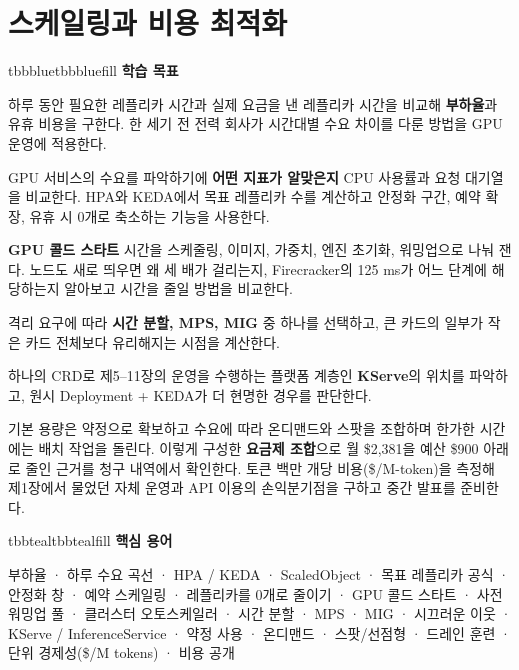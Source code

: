 \setcounter{chapter}{11}
\chapter{스케일링과 비용 최적화}

\begin{calloutbox}{tbbblue}{tbbbluefill}
{\normalsize\bfseries\color{tbbblue}학습 목표}\par\vspace{3pt}
\begin{tbbitemize}
  \item 하루 동안 필요한 레플리카 시간과 실제 요금을 낸 레플리카 시간을 비교해 \textbf{부하율}과 유휴 비용을 구한다. 한 세기 전 전력 회사가 시간대별 수요 차이를 다룬 방법을 GPU 운영에 적용한다.
  \item GPU 서비스의 수요를 파악하기에 \textbf{어떤 지표가 알맞은지} CPU 사용률과 요청 대기열을 비교한다. HPA와 KEDA에서 목표 레플리카 수를 계산하고 안정화 구간, 예약 확장, 유휴 시 0개로 축소하는 기능을 사용한다.
  \item \textbf{GPU 콜드 스타트} 시간을 스케줄링, 이미지, 가중치, 엔진 초기화, 워밍업으로 나눠 잰다. 노드도 새로 띄우면 왜 세 배가 걸리는지, Firecracker의 125 ms가 어느 단계에 해당하는지 알아보고 시간을 줄일 방법을 비교한다.
  \item 격리 요구에 따라 \textbf{시간 분할, MPS, MIG} 중 하나를 선택하고, 큰 카드의 일부가 작은 카드 전체보다 유리해지는 시점을 계산한다.
  \item 하나의 CRD로 제5–11장의 운영을 수행하는 플랫폼 계층인 \textbf{KServe}의 위치를 파악하고, 원시 Deployment + KEDA가 더 현명한 경우를 판단한다.
  \item 기본 용량은 약정으로 확보하고 수요에 따라 온디맨드와 스팟을 조합하며 한가한 시간에는 배치 작업을 돌린다. 이렇게 구성한 \textbf{요금제 조합}으로 월 \$2,381을 예산 \$900 아래로 줄인 근거를 청구 내역에서 확인한다. 토큰 백만 개당 비용(\$/M-token)을 측정해 제1장에서 물었던 자체 운영과 API 이용의 손익분기점을 구하고 중간 발표를 준비한다.
\end{tbbitemize}
\end{calloutbox}

\vspace{2.5pt}

\begin{calloutbox}{tbbteal}{tbbtealfill}
{\normalsize\bfseries\color{tbbteal}핵심 용어}\par\vspace{3pt}
부하율 · 하루 수요 곡선 · HPA / KEDA · ScaledObject · 목표 레플리카 공식 · 안정화 창 · 예약 스케일링 · 레플리카를 0개로 줄이기 · GPU 콜드 스타트 · 사전 워밍업 풀 · 클러스터 오토스케일러 · 시간 분할 · MPS · MIG · 시끄러운 이웃 · KServe / InferenceService · 약정 사용 · 온디맨드 · 스팟/선점형 · 드레인 훈련 · 단위 경제성(\$/M tokens) · 비용 공개
\end{calloutbox}

